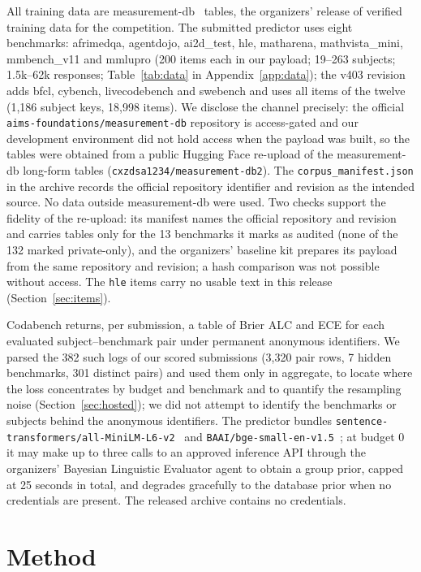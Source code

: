 \documentclass{article}
\begin{document}
All training data are measurement-db~\cite{mdb} tables, the organizers' release of verified training data for the competition. The submitted predictor uses eight benchmarks: afrimedqa, agentdojo, ai2d\_test, hle, matharena, mathvista\_mini, mmbench\_v11 and mmlupro (200 items each in our payload; 19--263 subjects; 1.5k--62k responses; Table~\ref{tab:data} in Appendix~\ref{app:data}); the v403 revision adds bfcl, cybench, livecodebench and swebench and uses all items of the twelve (1{,}186 subject keys, 18{,}998 items). We disclose the channel precisely: the official \texttt{aims-foundations/measurement-db} repository is access-gated and our development environment did not hold access when the payload was built, so the tables were obtained from a public Hugging Face re-upload of the measurement-db long-form tables (\texttt{cxzdsa1234/measurement-db2}). The \texttt{corpus\_manifest.json} in the archive records the official repository identifier and revision as the intended source. No data outside measurement-db were used. Two checks support the fidelity of the re-upload: its manifest names the official repository and revision and carries tables only for the 13 benchmarks it marks as audited (none of the 132 marked private-only), and the organizers' baseline kit prepares its payload from the same repository and revision; a hash comparison was not possible without access. The \texttt{hle} items carry no usable text in this release (Section~\ref{sec:items}).

Codabench returns, per submission, a table of Brier ALC and ECE for each evaluated subject--benchmark pair under permanent anonymous identifiers. We parsed the 382 such logs of our scored submissions (3{,}320 pair rows, 7 hidden benchmarks, 301 distinct pairs) and used them only in aggregate, to locate where the loss concentrates by budget and benchmark and to quantify the resampling noise (Section~\ref{sec:hosted}); we did not attempt to identify the benchmarks or subjects behind the anonymous identifiers. The predictor bundles \texttt{sentence-transformers/all-MiniLM-L6-v2}~\cite{minilm} and \texttt{BAAI/bge-small-en-v1.5}~\cite{bge}; at budget 0 it may make up to three calls to an approved inference API through the organizers' Bayesian Linguistic Evaluator agent to obtain a group prior, capped at 25 seconds in total, and degrades gracefully to the database prior when no credentials are present. The released archive contains no credentials.

\section{Method}
\label{sec:method}
\end{document}
